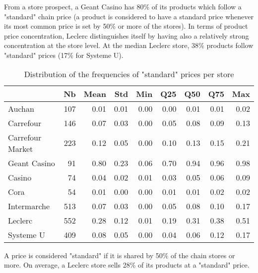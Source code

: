 \documentclass[english]{article}
\begin{document}
From a store prospect, a Geant Casino has 80\% of its products which follow a "standard" chain price (a product is considered to have a standard price whenever its most common price is set by 50\% or more of the stores). In terms of product price concentration, Leclerc distinguishes itself by having also a relatively strong concentration at the store level. At the median Leclerc store, 38\% products follow "standard" prices (17\% for Systeme U).

\begin{table}[H]
\caption{Distribution of the frequencies of "standard" prices per store}
\label{tab:qlmc_store_freq}
\begin{threeparttable}
\renewcommand{\arraystretch}{0.7}%
\small
\begin{tabular}{lrrrrrrrr}
\toprule
\toprule
{}                &  Nb &  Mean &  Std &  Min &  Q25 &  Q50 &  Q75 &  Max \\
\midrule
Auchan            & 107 &  0.01 & 0.01 & 0.00 & 0.00 & 0.01 & 0.01 & 0.02 \\
Carrefour         & 146 &  0.07 & 0.03 & 0.00 & 0.05 & 0.08 & 0.09 & 0.13 \\
Carrefour Market  & 223 &  0.12 & 0.05 & 0.00 & 0.10 & 0.13 & 0.15 & 0.21 \\
Geant Casino      &  91 &  0.80 & 0.23 & 0.06 & 0.70 & 0.94 & 0.96 & 0.98 \\
Casino            &  74 &  0.04 & 0.02 & 0.01 & 0.03 & 0.05 & 0.06 & 0.09 \\
Cora              &  54 &  0.01 & 0.00 & 0.00 & 0.01 & 0.01 & 0.02 & 0.02 \\
Intermarche       & 513 &  0.07 & 0.03 & 0.00 & 0.05 & 0.08 & 0.10 & 0.17 \\
Leclerc           & 552 &  0.28 & 0.12 & 0.01 & 0.19 & 0.31 & 0.38 & 0.51 \\
Systeme U         & 409 &  0.08 & 0.05 & 0.00 & 0.04 & 0.06 & 0.12 & 0.17 \\
\bottomrule
\bottomrule
\end{tabular}
\begin{tablenotes}
      \small
      \item A price is considered "standard" if it is shared by 50\% of the chain stores or more. On average, a Leclerc store sells 28\% of its products at a "standard" price.
\end{tablenotes}
\end{threeparttable}
\end{table}
\end{document}
